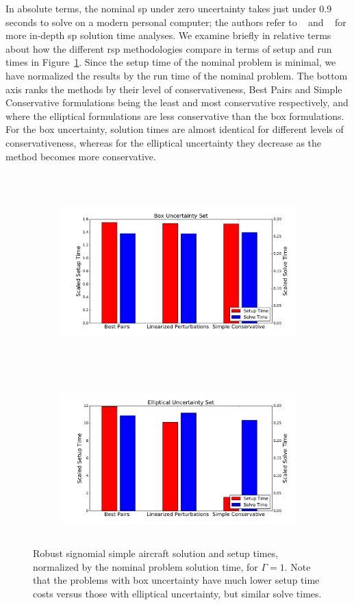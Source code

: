 In absolute
terms, the nominal \gls{sp} under zero uncertainty
takes just under 0.9 seconds to solve on a modern personal computer; the authors
refer to ~\cite{Kirschen2018Log} and ~\cite{York2018} for more in-depth \gls{sp} solution time analyses.
We examine briefly in relative terms about how the different \gls{rsp} methodologies compare in terms of setup and
run times in Figure~\ref{compare_signomial}. Since the setup time of the nominal problem is minimal,
we have normalized the results by the run time of the nominal problem.
The bottom axis ranks the methods by their level of conservativeness, Best Pairs
and Simple Conservative formulations being the least and most conservative respectively,
and where the elliptical formulations are less conservative than the box formulations.
For the box uncertainty, solution times are almost identical for different levels of conservativeness,
whereas for the elliptical uncertainty they decrease as the method becomes more conservative.

\ \\
\begin{figure}[ht]
    \centering
    \captionsetup{justification=centering, font=small}
    \begin{subfigure}{0.49\textwidth}
        \centering
        \includegraphics[height=2.3in]{signomial_simple_flight/box_sst.pdf}
    \end{subfigure}
    ~
    \begin{subfigure}{0.49\textwidth}
        \centering
        \includegraphics[height=2.3in]{signomial_simple_flight/ell_sst.pdf}
    \end{subfigure}
    \caption{Robust signomial simple aircraft solution and setup times, normalized by the
    nominal problem solution time, for $\Gamma = 1$.
    Note that the problems with box uncertainty have much lower setup
    time costs versus those with elliptical uncertainty, but similar solve times.}
    \label{compare_signomial}
\end{figure}

